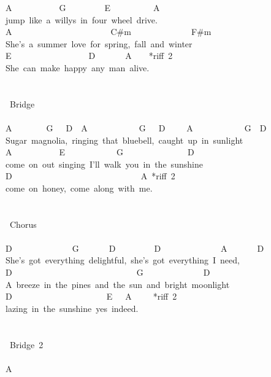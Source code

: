 {A\ \ \ \ \ \ \ \ \ \ \ G\ \ \ \ \ \ \ \ \ E\ \ \ \ \ \ \ \ \ \ A\\
jump\ like\ a\ willys\ in\ four\ wheel\ drive.\\
A\ \ \ \ \ \ \ \ \ \ \ \ \ \ \ \ \ \ \ \ \ \ \ C\#m\ \ \ \ \ \ \ \ \ \ \ \ \ \ F\#m\\
She's\ a\ summer\ love\ for\ spring,\ fall\ and\ winter\\
E\ \ \ \ \ \ \ \ \ \ \ \ \ \ \ \ \ \ D\ \ \ \ \ \ \ A\ \ \ \ *riff\ 2\\
She\ can\ make\ happy\ any\ man\ alive.\\
\\
\\
\lbrack\ Bridge\rbrack\\
\\
A\ \ \ \ \ \ \ \ G\ \ \ D\ \ A\ \ \ \ \ \ \ \ \ \ \ \ G\ \ \ D\ \ \ \ \ A\ \ \ \ \ \ \ \ \ \ \ \ G\ \ D\\
Sugar\ magnolia,\ ringing\ that\ bluebell,\ caught\ up\ in\ sunlight\\
A\ \ \ \ \ \ \ \ \ \ \ E\ \ \ \ \ \ \ \ \ \ \ \ G\ \ \ \ \ \ \ \ \ \ \ \ \ \ \ D\ \ \ \ \ \ \ \ \\
come\ on\ out\ singing\ I'll\ walk\ you\ in\ the\ sunshine\\
D\ \ \ \ \ \ \ \ \ \ \ \ \ \ \ \ \ \ \ \ \ \ \ \ \ \ \ \ \ \ A\ *riff\ 2\\
come\ on\ honey,\ come\ along\ with\ me.\\
\\
\\
\lbrack\ Chorus\rbrack\\
\\
D\ \ \ \ \ \ \ \ \ \ \ \ \ \ G\ \ \ \ \ \ \ D\ \ \ \ \ \ \ \ \ D\ \ \ \ \ \ \ \ \ \ \ \ \ \ A\ \ \ \ \ \ \ D\\
She's\ got\ everything\ delightful,\ she's\ got\ everything\ I\ need,\\
D\ \ \ \ \ \ \ \ \ \ \ \ \ \ \ \ \ \ \ \ \ \ \ \ \ \ \ \ \ G\ \ \ \ \ \ \ \ \ \ \ \ \ \ D\\
A\ breeze\ in\ the\ pines\ and\ the\ sun\ and\ bright\ moonlight\\
D\ \ \ \ \ \ \ \ \ \ \ \ \ \ \ \ \ \ \ \ \ \ E\ \ \ A\ \ \ \ \ *riff\ 2\\
lazing\ in\ the\ sunshine\ yes\ indeed.\\
\\
\\
\lbrack\ Bridge\ 2\rbrack\\
\\
A\ \ \ \ \ \ \ \ \ \ \ \ \ \ \ \ \ \ \\
}
